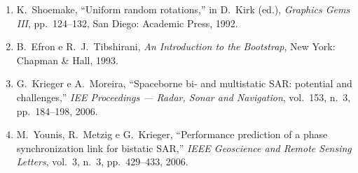 \documentclass[12pt,a4paper,oneside]{book}
\theoremstyle{remark}
\theoremstyle{plain}
\theoremstyle{definition}
\begin{document}
\begin{enumerate}
  \item \label{ref:shoemake1992}
  K.\ Shoemake, ``Uniform random rotations,'' in D.\ Kirk (ed.),
  \textit{Graphics Gems III}, pp.\ 124--132, San Diego: Academic Press, 1992.

  \item \label{ref:efron1993}
  B.\ Efron e R.\ J.\ Tibshirani, \textit{An Introduction to the Bootstrap},
  New York: Chapman \& Hall, 1993.

  \item \label{ref:krieger2006}
  G.\ Krieger e A.\ Moreira, ``Spaceborne bi- and multistatic SAR: potential
  and challenges,'' \textit{IEE Proceedings --- Radar, Sonar and Navigation},
  vol.\ 153, n.\ 3, pp.\ 184--198, 2006.

  \item \label{ref:younis2006}
  M.\ Younis, R.\ Metzig e G.\ Krieger, ``Performance prediction of a phase
  synchronization link for bistatic SAR,'' \textit{IEEE Geoscience and Remote
  Sensing Letters}, vol.\ 3, n.\ 3, pp.\ 429--433, 2006.

\end{enumerate}
\end{document}
